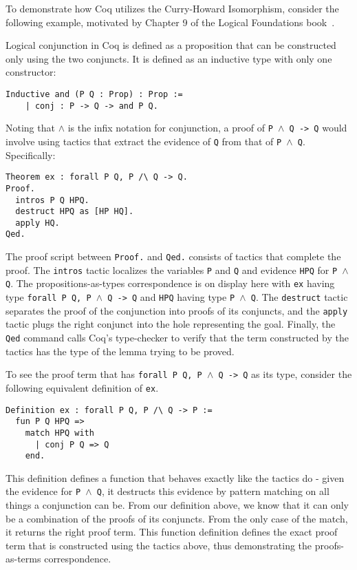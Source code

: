 \documentclass{article}
\begin{document}
	To demonstrate how Coq utilizes 
	the Curry-Howard Isomorphism, 
	consider the following example, 
	motivated by Chapter 9 of the 
	Logical Foundations 
	book~\cite{Pierce:SF1}.
	
	Logical conjunction in Coq is 
	defined as a proposition that 
	can be constructed only using 
	the two conjuncts. It is defined
	as an inductive type with 
	only one constructor:
	\begin{verbatim}
Inductive and (P Q : Prop) : Prop :=
	| conj : P -> Q -> and P Q.
	\end{verbatim}
	
	Noting that $\land$ is the infix 
	notation for conjunction, 
	a proof of \texttt{P $\land$ Q -> Q} 
	would involve using tactics that
	extract the evidence of \texttt{Q}
	from that of \texttt{P $\land$ Q}.
	Specifically:
	\begin{verbatim}
Theorem ex : forall P Q, P /\ Q -> Q.
Proof.
  intros P Q HPQ. 
  destruct HPQ as [HP HQ].
  apply HQ.
Qed.
	\end{verbatim}
	The proof script between 
	\texttt{Proof.} and \texttt{Qed.}
	consists of tactics that complete 
	the proof. The \texttt{intros}
	tactic localizes the variables 
	\texttt{P} and \texttt{Q} and 
	evidence \texttt{HPQ} for 
	\texttt{P $\land$ Q}. The 
	propositions-as-types correspondence
	is on display here with \texttt{ex}
	having type 
	\texttt{forall P Q, P $\land$ Q -> Q}
	and \texttt{HPQ} having type
	\texttt{P $\land$ Q}. The 
	\texttt{destruct} tactic separates 
	the proof of the conjunction into 
	proofs of its conjuncts, and the 
	\texttt{apply} tactic plugs the 
	right conjunct into the hole 
	representing the goal. Finally,
	the \texttt{Qed} command calls 
	Coq's type-checker to verify that 
	the term constructed by the 
	tactics has the type of the 
	lemma trying to be proved.
	
	To see the proof term that has 
	\texttt{forall P Q, P $\land$ Q -> Q}
	as its type, consider the following
	equivalent definition of \texttt{ex}.
	
\begin{verbatim}
Definition ex : forall P Q, P /\ Q -> P :=
  fun P Q HPQ => 
    match HPQ with
	  | conj P Q => Q
    end.
\end{verbatim}
	This definition defines a function that 
	behaves exactly like the tactics do - 
	given the evidence for \texttt{P $\land$ Q},
	it destructs this evidence by pattern
	matching on all things a conjunction can 
	be. From our definition above, we know 
	that it can only be a combination of 
	the proofs of its conjuncts. From the 
	only case of the match, it returns the 
	right proof term. This function 
	definition defines the exact proof term 
	that is constructed using the tactics 
	above, thus demonstrating the 
	proofs-as-terms correspondence.
\end{document}
